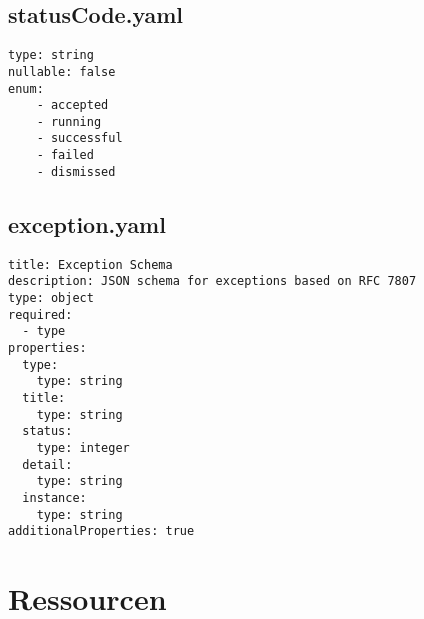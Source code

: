 \subsection{statusCode.yaml}
\begin{lstlisting}[caption={statusCode.yaml}, style = JSON]
type: string
nullable: false
enum:
    - accepted
    - running
    - successful
    - failed
    - dismissed
\end{lstlisting}\label{SchemaStatusCodeyaml}

\subsection{exception.yaml}
\begin{lstlisting}[caption={exception.yaml}, style = JSON]
title: Exception Schema
description: JSON schema for exceptions based on RFC 7807
type: object
required:
  - type
properties:
  type:
    type: string
  title:
    type: string
  status:
    type: integer
  detail:
    type: string
  instance:
    type: string
additionalProperties: true
\end{lstlisting}\label{SchemaExceptionyaml}

\section{Ressourcen}
\renewcommand{\lstlistingname}{Ressource}
